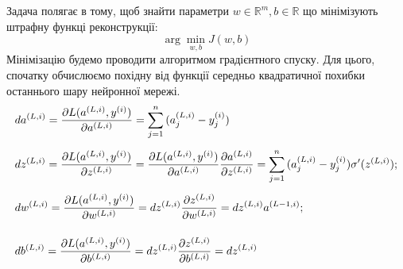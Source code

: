 \documentclass[14pt,a4paper]{extarticle}
\newcounter{e}
\numberwithin{equation}{section}
\numberwithin{figure}{section}
\newcommand{\ith}{^{(i)}}
\begin{document}
	Задача полягає в тому, щоб знайти параметри $w \in \mathbb{R}^{m}, b\in \mathbb{R}$ що мінімізують штрафну функці реконструкції:
	\begin{equation}
		\arg \min_{w, b} J (w, b)
	\end{equation}
	Мінімізацію будемо проводити алгоритмом градієнтного спуску. Для цього, спочатку обчислюємо похідну від функції середньо квадратичної похибки останнього шару нейронної мережі.
	\begin{equation*}
		\begin{array}{l}
			\displaystyle
			da^{(L, i)}
			=
			\pdv{L(a^{(L, i)}, y\ith)}{a^{(L, i)}}
			=
			\sum_{j=1}^{n}{(a^{(L, i)}_j - y\ith_j)}
			\\[0.7cm]

			\displaystyle
			dz^{(L, i)}
			=
			\pdv{L(a^{(L, i)}, y\ith)}{z^{(L, i)}}
			= 
			\pdv{L(a^{(L, i)}, y\ith)}{a^{(L, i)}} \pdv{a^{(L, i)}}{z^{(L, i)}}
			=
			\sum_{j=1}^{n}{(a^{(L, i)}_j - y\ith_j)} \sigma^{\prime}(z^{(L, i)});
			\\[0.7cm]

			\displaystyle
			dw^{(L, i)} 
			=
			\pdv{L(a^{(L, i)}, y\ith)}{w^{(L, i)}}
			=
			dz^{(L, i)} \pdv{z^{(L, i)}}{w^{(L, i)}}
			=
			dz^{(L, i)} a^{(L-1, i)};
			\\[0.7cm]
	
			\displaystyle
			db^{(L, i)}
			=
			\pdv{L(a^{(L, i)}, y\ith)}{b^{(L, i)}}
			=
			dz^{(L, i)} \pdv{z^{(L, i)}}{b^{(L, i)}} 
			= 
			dz^{(L, i)}
			\\[0.7cm]
		\end{array}
	\end{equation*}

\end{document}
